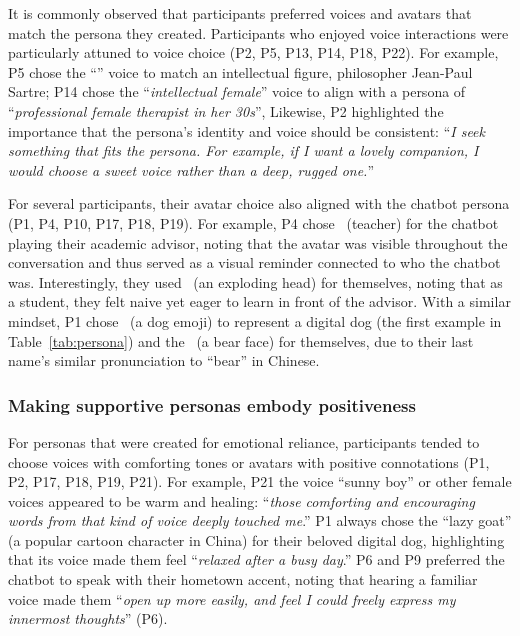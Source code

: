 It is commonly observed that participants preferred voices and avatars that match the persona they created.
Participants who enjoyed voice interactions were particularly attuned to voice choice (P2, P5, P13, P14, P18, P22). For example, P5 
chose the ``\textit{}'' voice to match an intellectual figure, philosopher Jean-Paul Sartre; P14 chose the ``\textit{intellectual female}'' voice to align with a persona of ``\textit{professional female therapist in her 30s}'', 
Likewise, P2 highlighted the importance that the persona's identity and voice should be consistent:
``\textit{I seek something that fits the persona. For example, if I want a lovely companion, I would choose a sweet voice rather than a deep, rugged one.}''


For several participants, their avatar choice also aligned with the chatbot persona (P1, P4, P10, P17, P18, P19). For example, P4 chose~ (teacher) for the chatbot playing their academic advisor, noting that the avatar was visible throughout the conversation and thus served as a visual reminder connected to who the chatbot was. Interestingly, they used~ (an exploding head) for themselves, noting that as a student, they felt naive yet eager to learn in front of the advisor.
With a similar mindset, P1 chose~ (a dog emoji) to represent a digital dog (the first example in Table~\ref{tab:persona}) and the~ (a bear face) for themselves, due to their last name's similar pronunciation to ``bear'' in Chinese.



\subsubsection{Making supportive personas embody positiveness}
For personas that were created for emotional reliance, participants tended to choose voices with comforting tones or avatars with positive connotations (P1, P2, P17, P18, P19, P21). For example, P21  the voice ``sunny boy'' or other  female voices   appeared to be warm and healing: ``\textit{those comforting and encouraging words from that kind of voice deeply touched me}.'' 
P1 always chose the ``lazy goat'' (a popular cartoon character in China) for their beloved digital dog, highlighting that its voice made them feel ``\textit{relaxed after a busy day}.''
P6 and P9 preferred the chatbot to speak with their hometown accent, noting that hearing a familiar voice made them ``\textit{open up more easily, and feel I could freely express my innermost thoughts}'' (P6). 

